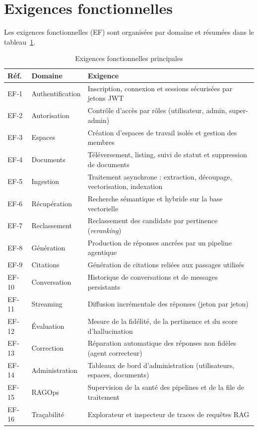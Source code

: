 \documentclass[12pt,a4paper,oneside]{report}
\begin{document}
\section{Exigences fonctionnelles}
Les exigences fonctionnelles (EF) sont organisées par domaine et résumées dans le
tableau~\ref{tab:ef}.

\begin{table}[H]
\centering
\caption{Exigences fonctionnelles principales}
\label{tab:ef}
\small
\begin{tabularx}{\textwidth}{@{}l l X@{}}
\toprule
\textbf{Réf.} & \textbf{Domaine} & \textbf{Exigence} \\
\midrule
EF-1  & Authentification & Inscription, connexion et sessions sécurisées par jetons JWT \\
EF-2  & Autorisation     & Contrôle d'accès par rôles (utilisateur, admin, super-admin) \\
EF-3  & Espaces          & Création d'espaces de travail isolés et gestion des membres \\
EF-4  & Documents        & Téléversement, listing, suivi de statut et suppression de documents \\
EF-5  & Ingestion        & Traitement asynchrone : extraction, découpage, vectorisation, indexation \\
EF-6  & Récupération     & Recherche sémantique et hybride sur la base vectorielle \\
EF-7  & Reclassement     & Reclassement des candidats par pertinence (\emph{reranking}) \\
EF-8  & Génération       & Production de réponses ancrées par un pipeline agentique \\
EF-9  & Citations        & Génération de citations reliées aux passages utilisés \\
EF-10 & Conversation     & Historique de conversations et de messages persistants \\
EF-11 & Streaming        & Diffusion incrémentale des réponses (jeton par jeton) \\
EF-12 & Évaluation       & Mesure de la fidélité, de la pertinence et du score d'hallucination \\
EF-13 & Correction       & Réparation automatique des réponses non fidèles (agent correcteur) \\
EF-14 & Administration   & Tableaux de bord d'administration (utilisateurs, espaces, documents) \\
EF-15 & RAGOps           & Supervision de la santé des pipelines et de la file de traitement \\
EF-16 & Traçabilité      & Explorateur et inspecteur de traces de requêtes RAG \\
\bottomrule
\end{tabularx}
\end{table}
\end{document}
